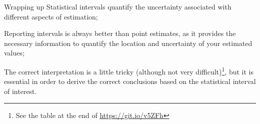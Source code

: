 %
%
%
%
%
%


\begin{frame}{Wrapping up}
Statistical intervals quantify the uncertainty associated with different aspects of estimation;
\bigskip

Reporting intervals is always better than point estimates, as it provides the necessary information to quantify the location and uncertainty of your estimated values;
\bigskip

The correct interpretation is a little tricky (although not very difficult)\footnote{See the table at the end of  \url{https://git.io/v5ZFh}}, but it is essential in order to derive the correct conclusions based on the statistical interval of interest.
\end{frame}


